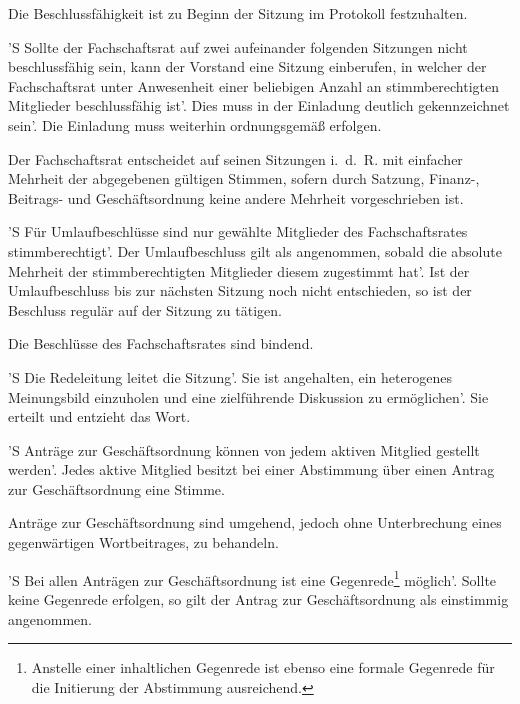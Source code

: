 \documentclass[%
	parskip=half,
]{scrartcl}
\newcommand{\edit}[1]{{\color{red} #1}}
\newcommand{\add}[1]{{\color{blue} #1}}
\newcommand{\new}[1]{{\color{orange} #1}}
\begin{document}
\begin{contract}
Die Beschlussfähigkeit ist zu Beginn der Sitzung \add{im Protokoll} festzuhalten.

'S Sollte der Fachschaftsrat auf zwei aufeinander folgenden Sitzungen nicht beschlussfähig sein, \edit{kann der 
Vorstand} eine Sitzung einberufen, in welcher der Fachschaftsrat unter Anwesenheit einer beliebigen Anzahl an 
stimmberechtigten Mitglieder beschlussfähig ist'. Dies muss in der Einladung deutlich gekennzeichnet sein'. Die 
Einladung muss weiterhin ordnungsgemäß erfolgen.

Der Fachschaftsrat entscheidet auf seinen Sitzungen i.~d.~R. mit einfacher Mehrheit der abgegebenen gültigen Stimmen, 
sofern durch Satzung, Finanz-, Beitrags- und Geschäftsordnung keine andere Mehrheit vorgeschrieben ist.

'S Für Umlaufbeschlüsse sind nur gewählte Mitglieder des Fachschaftsrates stimmberechtigt'. Der Umlaufbeschluss gilt 
als angenommen, sobald die absolute Mehrheit \add{der stimmberechtigten Mitglieder} diesem zugestimmt hat'. Ist der 
Umlaufbeschluss bis zur nächsten Sitzung noch nicht entschieden, so ist der Beschluss regulär auf der Sitzung zu 
tätigen.

Die Beschlüsse des Fachschaftsrates sind bindend.

\Clause{title={\edit{Redeleitung}}}

'S Die \edit{Redeleitung} leitet die Sitzung'. Sie ist angehalten, ein heterogenes Meinungsbild einzuholen und eine 
zielführende Diskussion zu ermöglichen'. Sie erteilt und entzieht das Wort.


\add{'S Anträge zur Geschäftsordnung können von jedem \new{aktiven} Mitglied gestellt werden'. Jedes \new{aktive} 
Mitglied besitzt bei einer Abstimmung über einen Antrag zur Geschäftsordnung eine Stimme.}

Anträge zur Geschäftsordnung sind umgehend, jedoch ohne \edit{Unterbrechung eines gegenwärtigen Wortbeitrages}, zu 
behandeln.

'S Bei allen Anträgen zur Geschäftsordnung ist eine Gegenrede\footnote{\add{Anstelle einer inhaltlichen Gegenrede 
ist ebenso eine formale Gegenrede für die Initierung der Abstimmung ausreichend.}} möglich'. Sollte keine Gegenrede 
erfolgen, so gilt der Antrag zur Geschäftsordnung als einstimmig angenommen.


\end{contract}
\end{document}
